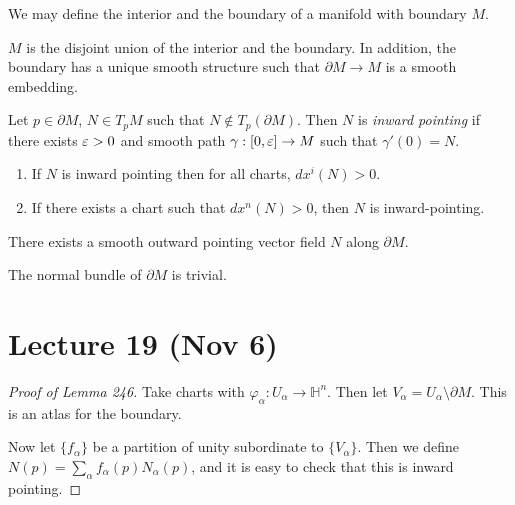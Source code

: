 \documentclass[twoside, 10pt]{article}
\renewcommand{\H}{\mathbb{H}}
\begin{document}
    \begin{defn}
        We may define the interior and the boundary of a manifold with boundary $M$.
    \end{defn}

    \begin{prop}
        $M$ is the disjoint union of the interior and the boundary. In addition, the boundary has a unique smooth structure such that $\partial M \to M$ is a smooth embedding.
    \end{prop}

    \begin{defn}
        Let $p \in \partial M$, $N \in T_pM$ such that $N \notin T_p(\partial M)$. Then $N$ is \textit{inward pointing} if there exists $\varepsilon > 0$ and smooth path $\gamma: [0,\varepsilon] \to M$ such that $\gamma'(0) = N$.
    \end{defn}

    \begin{lem}
        \begin{enumerate}
            \item If $N$ is inward pointing then for all charts, $dx^i(N) > 0$.
            \item If there exists a chart such that $dx^n(N) > 0$, then $N$ is inward-pointing.
        \end{enumerate}
    \end{lem}

    \begin{lem}
        There exists a smooth outward pointing vector field $N$ along $\partial M$.
    \end{lem}

    \begin{cor}
        The normal bundle of $\partial M$ is trivial.
    \end{cor}

    \section{Lecture 19 (Nov 6)}%
    \label{sec:lecture_19_nov_6_}
    
    \begin{proof}[Proof of Lemma 246]
        Take charts with $\varphi_{\alpha}: U_{\alpha} \to \H^n$. Then let $V_{\alpha} = U_{\alpha} \setminus \partial M$. This is an atlas for the boundary.

        Now let $\{f_{\alpha} \} $ be a partition of unity subordinate to $\{V_{\alpha}\}$. Then we define $N(p) = \sum_{\alpha} f_{\alpha}(p) N_{\alpha}(p)$, and it is easy to check that this is inward pointing.
    \end{proof}
\end{document}
